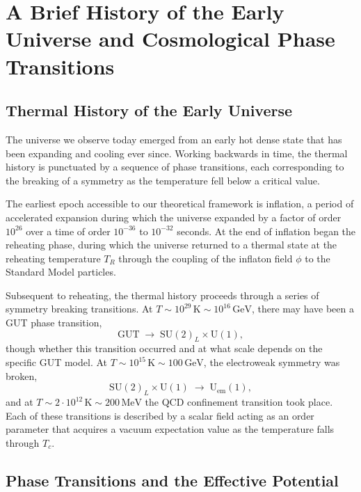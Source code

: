 \chapter{A Brief History of the Early Universe and Cosmological Phase Transitions}
\label{ch:early-universe}

\section{Thermal History of the Early Universe}

The universe we observe today emerged from an early hot dense state that
has been expanding and cooling ever since. Working backwards in time,
the thermal history is punctuated by a sequence of phase transitions,
each corresponding to the breaking of a symmetry as the temperature fell
below a critical value.

The earliest epoch accessible to our theoretical framework is inflation,
a period of accelerated expansion during which the universe expanded by
a factor of order $10^{26}$ over a time of order $10^{-36}$ to
$10^{-32}$ seconds. At the end of inflation began the reheating phase,
during which the universe returned to a thermal state at the reheating
temperature $T_R$ through the coupling of the inflaton field $\phi$ to
the Standard Model particles.

Subsequent to reheating, the thermal history proceeds through a series
of symmetry breaking transitions. At $T\sim 10^{29}\,\text{K}\sim
	10^{16}\,\text{GeV}$, there may have been a GUT phase transition,
\begin{equation}
	\text{GUT} \;\longrightarrow\; \mathrm{SU}(2)_L\times\mathrm{U}(1),
\end{equation}
though whether this transition occurred and at what scale depends on the
specific GUT model. At $T\sim 10^{15}\,\text{K}\sim 100\,\text{GeV}$,
the electroweak symmetry was broken,
\begin{equation}
	\mathrm{SU}(2)_L\times\mathrm{U}(1)
	\;\longrightarrow\; \mathrm{U}_{\text{em}}(1),
\end{equation}
and at $T\sim 2\cdot 10^{12}\,\text{K}\sim 200\,\text{MeV}$ the QCD
confinement transition took place. Each of these transitions is
described by a scalar field acting as an order parameter that acquires
a vacuum expectation value as the temperature falls through $T_c$.

\section{Phase Transitions and the Effective Potential}

